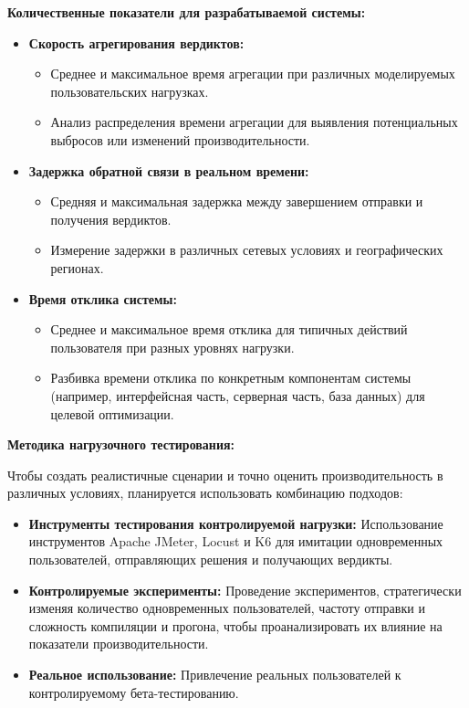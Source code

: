 \textbf{Количественные показатели для разрабатываемой системы:}
\noindent
\begin{itemize}
    \itemsep 0em
\item \textbf{Скорость агрегирования вердиктов:}
    \begin{itemize}
        \itemsep 0em
    \item Среднее и максимальное время агрегации при различных моделируемых пользовательских нагрузках.
    \item Анализ распределения времени агрегации для выявления потенциальных выбросов или изменений производительности.
    \end{itemize}
\item \textbf{Задержка обратной связи в реальном времени:}
    \begin{itemize}
        \itemsep 0em
    \item Средняя и максимальная задержка между завершением отправки и получения вердиктов.
    \item Измерение задержки в различных сетевых условиях и географических регионах.
    \end{itemize}
\item \textbf{Время отклика системы:}
    \begin{itemize}
        \itemsep 0em
    \item Среднее и максимальное время отклика для типичных действий пользователя при разных уровнях нагрузки.
    \item Разбивка времени отклика по конкретным компонентам системы (например, интерфейсная часть, серверная часть, база данных) для целевой оптимизации.
    \end{itemize}
\end{itemize}
\noindent
\textbf{Методика нагрузочного тестирования:}

Чтобы создать реалистичные сценарии и точно оценить производительность в различных условиях, планируется использовать комбинацию подходов:
\begin{itemize}
    \item \textbf{Инструменты тестирования контролируемой нагрузки:} Использование инструментов Apache JMeter, Locust и K6 для имитации одновременных пользователей, отправляющих решения и получающих вердикты.
    \item \textbf{Контролируемые эксперименты:} Проведение экспериментов, стратегически изменяя количество одновременных пользователей, частоту отправки и сложность компиляции и прогона, чтобы проанализировать их влияние на показатели производительности.
    \item \textbf{Реальное использование:} Привлечение реальных пользователей к контролируемому бета-тестированию.
\end{itemize}
